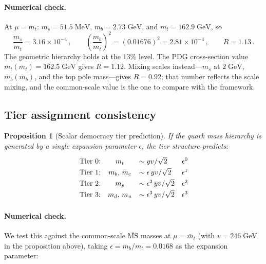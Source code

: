 \documentclass[11pt,a4paper]{article}
\theoremstyle{plain}
\newtheorem{proposition}{Proposition}
\begin{document}
\paragraph{Numerical check.}  At $\mu = \bar{m}_t$:
$m_s = 51.5\;\text{MeV}$, $m_b = 2.73\;\text{GeV}$, and
$m_t = 162.9\;\text{GeV}$, so
\begin{equation}
  \frac{m_s}{m_t} = 3.16 \times 10^{-4}\,,
  \qquad
  \left(\frac{m_b}{m_t}\right)^2 = (0.01676)^2 = 2.81 \times 10^{-4}\,,
  \qquad
  R = 1.13\,.
\end{equation}
The geometric hierarchy holds at the $13\%$ level.  The PDG
cross-section value $\bar{m}_t(\bar{m}_t) = 162.5\;\text{GeV}$ gives
$R = 1.12$.  Mixing scales instead---$m_s$ at $2\;\text{GeV}$,
$\bar{m}_b(\bar{m}_b)$, and the top pole mass---gives $R = 0.92$; that
number reflects the scale mixing, and the common-scale value is the one
to compare with the framework.

\subsection{Tier assignment consistency}

\begin{proposition}[Scalar democracy tier prediction]
\label{prop:tiers}
If the quark mass hierarchy is generated by a single expansion
parameter $\epsilon$, the tier structure predicts:
\begin{equation}\label{eq:tier-prediction}
\renewcommand{\arraystretch}{1.3}
\begin{array}{lcll}
  \text{Tier 0:} & m_t &\sim y v/\sqrt{2} & \epsilon^0 \\
  \text{Tier 1:} & m_b,\, m_c &\sim \epsilon\, y v/\sqrt{2} & \epsilon^1 \\
  \text{Tier 2:} & m_s &\sim \epsilon^2\, y v/\sqrt{2} & \epsilon^2 \\
  \text{Tier 3:} & m_d,\, m_u &\sim \epsilon^3\, y v/\sqrt{2} & \epsilon^3 \\
\end{array}
\end{equation}
\end{proposition}

\paragraph{Numerical check.} We test this against the common-scale
$\overline{\text{MS}}$ masses at $\mu = \bar{m}_t$ (with $v = 246\;\text{GeV}$
in the proposition above), taking $\epsilon = m_b/m_t = 0.0168$ as the
expansion parameter:
\end{document}

